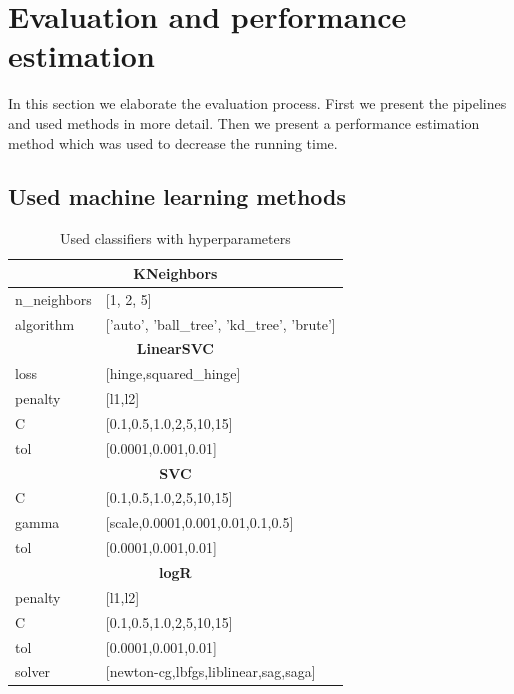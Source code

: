 \section{Evaluation and performance estimation} \label{sec:eval}
In this section we elaborate the evaluation process. First we present the
pipelines and used methods in more detail. Then we present a performance
estimation method which was used to decrease the running time.

\subsection{Used machine learning methods} \label{tab03:methods}

{\footnotesize
\begin{longtable}{l l}

\caption{Used classifiers with hyperparameters}\\
	
\toprule
\multicolumn{2}{c}{\textbf{KNeighbors}} \\
\midrule

n\_neighbors & [1, 2, 5] \\
algorithm & ['auto', 'ball\_tree', 'kd\_tree', 'brute'] \\

\midrule
\multicolumn{2}{c}{\textbf{LinearSVC }} \\
\midrule

loss & [hinge,squared\_hinge] \\
penalty & [l1,l2] \\
C & [0.1,0.5,1.0,2,5,10,15] \\
tol & [0.0001,0.001,0.01] \\
 
\midrule
\multicolumn{2}{c}{\textbf{SVC }} \\
\midrule

C & [0.1,0.5,1.0,2,5,10,15] \\
gamma & [scale,0.0001,0.001,0.01,0.1,0.5] \\
tol & [0.0001,0.001,0.01] \\
 
\midrule
\multicolumn{2}{c}{\textbf{logR }} \\
\midrule

penalty & [l1,l2] \\
C & [0.1,0.5,1.0,2,5,10,15] \\
tol & [0.0001,0.001,0.01] \\
solver & [newton-cg,lbfgs,liblinear,sag,saga] \\
 

\end{longtable}}
